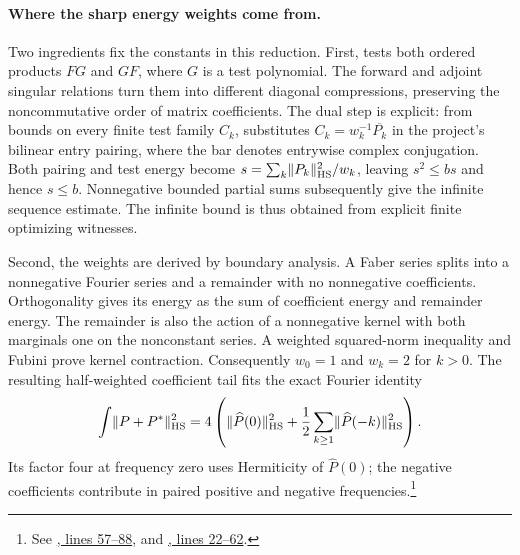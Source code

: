 \paragraph{Where the sharp energy weights come from.}
Two ingredients fix the constants in this reduction. First,
 tests both ordered products $FG$ and $GF$, where $G$ is a test polynomial.
The forward and adjoint singular relations turn them into different diagonal
compressions, preserving the noncommutative order of matrix coefficients.
The dual step is explicit: from bounds on every finite test family $C_k$,
 substitutes
$C_k=w_k^{-1}\overline{P_k}$ in the project's bilinear entry pairing,
where the bar denotes entrywise complex conjugation.
Both pairing and test energy become
$s=\sum_k\lVert P_k\rVert_{\mathrm{HS}}^2/w_k$, leaving $s^2\leq bs$ and hence
$s\leq b$. Nonnegative bounded partial sums subsequently give the infinite
sequence estimate. The infinite bound is thus obtained from explicit finite optimizing witnesses.

Second, the weights are derived by boundary analysis.
A Faber series splits into a nonnegative Fourier series and a remainder
with no nonnegative coefficients. Orthogonality gives its energy as
the sum of coefficient energy and remainder energy. The remainder is also
the action of a nonnegative kernel with both marginals one on the
nonconstant series. A weighted squared-norm inequality and Fubini prove
kernel contraction. Consequently $w_0=1$ and $w_k=2$ for $k>0$.
The resulting half-weighted coefficient tail fits the exact Fourier identity
\[
 \int\lVert P+P^*\rVert_{\mathrm{HS}}^2
 =4\left(\lVert\widehat P(0)\rVert_{\mathrm{HS}}^2
    +\frac12\sum_{k\geq1}\lVert\widehat P(-k)\rVert_{\mathrm{HS}}^2\right).
\]
Its factor four at frequency zero uses Hermiticity of $\widehat P(0)$;
the negative coefficients contribute in paired positive and negative
frequencies.\footnote{See
\href{https://github.com/openai/math/blob/fd4aeeb2ee4fc729c18d98444fed42fd0529eeeb/lean/OAI/Analysis/DirectCrouzeix/BoundaryEnergy.lean\#L57-L88}{, lines 57--88}, and
\href{https://github.com/openai/math/blob/fd4aeeb2ee4fc729c18d98444fed42fd0529eeeb/lean/OAI/Analysis/DirectCrouzeix/PositiveBlocks.lean\#L22-L62}{, lines 22--62}.}


